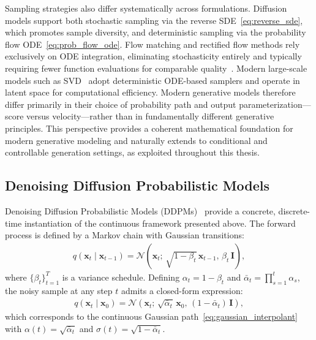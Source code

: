 Sampling strategies also differ systematically across formulations. Diffusion models support both stochastic sampling via the reverse SDE~\eqref{eq:reverse_sde}, which promotes sample diversity, and deterministic sampling via the probability flow ODE~\eqref{eq:prob_flow_ode}. Flow matching and rectified flow methods rely exclusively on ODE integration, eliminating stochasticity entirely and typically requiring fewer function evaluations for comparable quality~\cite{liu2023flow}. Modern large-scale models such as SVD~\cite{blattmann2023stable} adopt deterministic ODE-based samplers and operate in latent space for computational efficiency. Modern generative models therefore differ primarily in their choice of probability path and output parameterization---score versus velocity---rather than in fundamentally different generative principles. This perspective provides a coherent mathematical foundation for modern generative modeling and naturally extends to conditional and controllable generation settings, as exploited throughout this thesis.

\subsection{Denoising Diffusion Probabilistic Models}
\label{subsec:ddpm}

Denoising Diffusion Probabilistic Models (DDPMs)~\cite{ho2020denoising, sohldickstein2015deep} provide a concrete, discrete-time instantiation of the continuous framework presented above. The forward process is defined by a Markov chain with Gaussian transitions:
\begin{align}
    q(\mathbf{x}_t \mid \mathbf{x}_{t-1}) = \mathcal{N}\!\left(\mathbf{x}_t;\, \sqrt{1 - \beta_t}\,\mathbf{x}_{t-1},\, \beta_t\,\mathbf{I}\right),
    \label{eq:forward_step}
\end{align}
where $\{\beta_t\}_{t=1}^T$ is a variance schedule. Defining $\alpha_t = 1 - \beta_t$ and $\bar{\alpha}_t = \prod_{s=1}^t \alpha_s$, the noisy sample at any step $t$ admits a closed-form expression:
\begin{align}
    q(\mathbf{x}_t \mid \mathbf{x}_0) = \mathcal{N}\!\left(\mathbf{x}_t;\, \sqrt{\bar{\alpha}_t}\,\mathbf{x}_0,\, (1 - \bar{\alpha}_t)\,\mathbf{I}\right),
    \label{eq:forward_closed}
\end{align}
which corresponds to the continuous Gaussian path~\eqref{eq:gaussian_interpolant} with $\alpha(t) = \sqrt{\bar{\alpha}_t}$ and $\sigma(t) = \sqrt{1 - \bar{\alpha}_t}$.

